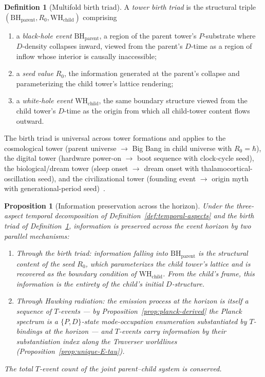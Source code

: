 \documentclass[11pt,a4paper]{article}
\newtheorem{proposition}[theorem]{Proposition}
\theoremstyle{definition}
\newtheorem{definition}[theorem]{Definition}
\theoremstyle{remark}
\begin{document}
\begin{definition}[Multifold birth triad]\label{def:birth-triad}
A \emph{tower birth triad} is the structural triple $(\mathrm{BH}_{\text{parent}}, R_{0}, \mathrm{WH}_{\text{child}})$ comprising
\begin{enumerate}[label=(\roman*),leftmargin=*]
\item a \emph{black-hole event} $\mathrm{BH}_{\text{parent}}$, a region of the parent tower's $P$-substrate where $D$-density collapses inward, viewed from the parent's $D$-time as a region of inflow whose interior is causally inaccessible;
\item a \emph{seed value} $R_{0}$, the information generated at the parent's collapse and parameterizing the child tower's lattice rendering;
\item a \emph{white-hole event} $\mathrm{WH}_{\text{child}}$, the same boundary structure viewed from the child tower's $D$-time as the origin from which all child-tower content flows outward.
\end{enumerate}
The birth triad is universal across tower formations and applies to the cosmological tower (parent universe $\to$ Big Bang in child universe with $R_{0} = \hbar$), the digital tower (hardware power-on $\to$ boot sequence with clock-cycle seed), the biological/dream tower (sleep onset $\to$ dream onset with thalamocortical-oscillation seed), and the civilizational tower (founding event $\to$ origin myth with generational-period seed)~\cite{Multifold}.
\end{definition}

\begin{proposition}[Information preservation across the horizon]\label{prop:info-preserve}
Under the three-aspect temporal decomposition of Definition~\ref{def:temporal-aspects} and the birth triad of Definition~\ref{def:birth-triad}, information is preserved across the event horizon by two parallel mechanisms:
\begin{enumerate}[leftmargin=*,label=(\roman*)]
\item Through the birth triad: information falling into $\mathrm{BH}_{\text{parent}}$ is the structural content of the seed $R_{0}$, which parameterizes the child tower's lattice and is recovered as the boundary condition of $\mathrm{WH}_{\text{child}}$. From the child's frame, this information is the entirety of the child's initial $D$-structure.
\item Through Hawking radiation: the emission process at the horizon is itself a sequence of $T$-events --- by Proposition~\ref{prop:planck-derived} the Planck spectrum is a $\{P,D\}$-state mode-occupation enumeration substantiated by $T$-bindings at the horizon --- and $T$-events carry information by their substantiation index along the Traverser worldlines (Proposition~\ref{prop:unique-E-tau}).
\end{enumerate}
The total $T$-event count of the joint parent--child system is conserved.
\end{proposition}
\end{document}
